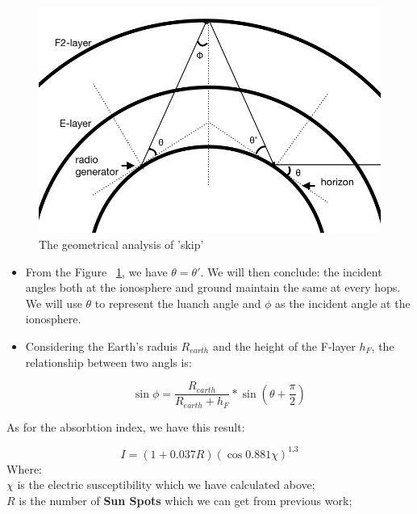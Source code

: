 \documentclass{mcmthesis}
\begin{document}
    \begin{figure}[ht]
    \centering
    \includegraphics[scale=0.3]{Multi_hop_angle}
    \caption{The geometrical analysis of 'skip' }
    \label{fig:Multi_hop_angle}
    \end{figure}

    \begin{itemize}
      \item From the Figure ~\ref{fig:Multi_hop_angle}, we have $\theta = \theta'$. We will then conclude: the incident angles both at the ionosphere and ground maintain the same at every hops. We will use $\theta$ to represent the luanch angle and $\phi$ as the incident angle at the ionosphere. \\
      \item Considering the Earth's raduis $R_{earth}$ and the height of the F-layer $h_F$, the relationship between two angls is:

        \begin{equation}\label{eq:getPHI}
          \sin\phi = \frac{R_{earth}}{R_{earth} + h_{F}} * \sin(\theta + \frac{\pi}{2})
        \end{equation}

    \end{itemize}



    As for the absorbtion index, we have this result:

     \begin{equation}\label{eq:IonosphereAbsorbtionIndex}
       I = (1 + 0.037 R)(\cos0.881\chi)^{1.3}
     \end{equation}
     Where:\\
     $\chi$ is the electric susceptibility which we have calculated above;\\
     $R$ is the number of \textbf{Sun Spots} which we can get from previous work\cite{dayandyearTECchange};
\end{document}

